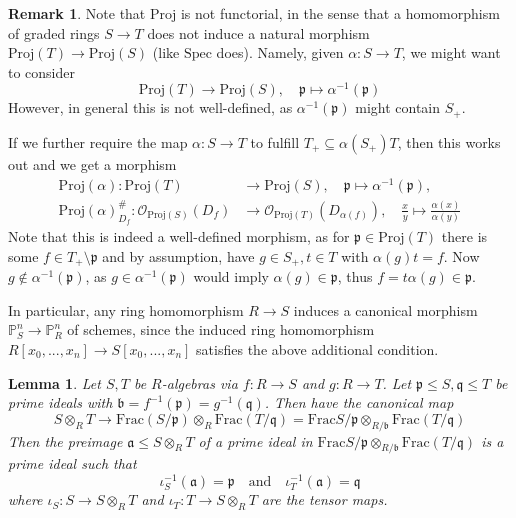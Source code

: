 \documentclass{scrartcl}
\renewcommand{\P}{\mathbb{P}}
\newcommand{\p}{\mathfrak{p}}
\newcommand{\q}{\mathfrak{q}}
\renewcommand{\a}{\mathfrak{a}}
\renewcommand{\b}{\mathfrak{b}}
\newcommand{\Spec}{\mathrm{Spec}}
\newcommand{\Proj}{\mathrm{Proj}}
\newcommand{\Frac}{\mathrm{Frac}}
\renewcommand{\O}{\mathcal{O}}
\newtheorem{lemma}[prop]{Lemma}
\theoremstyle{definition}
\newtheorem{remark}[prop]{Remark}
\begin{document}
\begin{remark}
    \label{prop:functoriality_proj}
    Note that $\Proj$ is not functorial, in the sense that a homomorphism of graded rings $S \to T$ does not induce a natural morphism $\Proj(T) \to \Proj(S)$ (like $\Spec$ does).
    Namely, given $\alpha: S \to T$, we might want to consider
    \begin{equation*}
        \Proj(T) \to \Proj(S), \quad \p \mapsto \alpha^{-1}(\p)
    \end{equation*}
    However, in general this is not well-defined, as $\alpha^{-1}(\p)$ might contain $S_+$.

    If we further require the map $\alpha: S \to T$ to fulfill $T_+ \subseteq \alpha(S_+)T$, then this works out and we get a morphism
    \begin{align*}
        \Proj(\alpha): \Proj(T) &\to \Proj(S), \quad \p \mapsto \alpha^{-1}(\p), \\
        \Proj(\alpha)^\#_{D_f}: \O_{\Proj(S)}(D_f) &\to \O_{\Proj(T)}(D_{\alpha(f)}), \quad \frac x y \mapsto \frac {\alpha(x)} {\alpha(y)}
    \end{align*}
    Note that this is indeed a well-defined morphism, as for $\p \in \Proj(T)$ there is some $f \in T_+ \setminus \p$ and by assumption, have $g \in S_+, t \in T$ with $\alpha(g)t = f$.
    Now $g \notin \alpha^{-1}(\p)$, as $g \in \alpha^{-1}(\p)$ would imply $\alpha(g) \in \p$, thus $f = t\alpha(g) \in \p$.

    In particular, any ring homomorphism $R \to S$ induces a canonical morphism $\P_S^n \to \P_R^n$ of schemes, since the induced ring homomorphism $R[x_0, ..., x_n] \to S[x_0, ..., x_n]$ satisfies the above additional condition.
\end{remark}
\begin{lemma}
    Let $S, T$ be $R$-algebras via $f: R \to S$ and $g: R \to T$.
    Let $\p \leq S, \q \leq T$ be prime ideals with $\b = f^{-1}(\p) = g^{-1}(\q)$.
    Then have the canonical map
    \begin{equation*}
        S \otimes_R T \to \Frac(S/\p) \otimes_R \Frac(T/\q) = \Frac{S/\p} \otimes_{R/\b} \Frac(T/\q)
    \end{equation*}
    Then the preimage $\a \leq S \otimes_R T$ of a prime ideal in $\Frac{S/\p} \otimes_{R/\b} \Frac(T/\q)$ is a prime ideal such that
    \begin{equation*}
        \iota_S^{-1}(\a) = \p \quad \text{and} \quad \iota_T^{-1}(\a) = \q
    \end{equation*}
    where $\iota_S: S \to S \otimes_R T$ and $\iota_T: T \to S \otimes_R T$ are the tensor maps.
\end{lemma}
\end{document}
